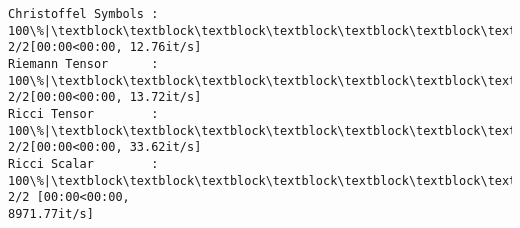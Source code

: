 \documentclass[11pt]{article}
\newcommand{\prompt}[4]{
        {\ttfamily\llap{{\color{#2}[#3]:\hspace{3pt}#4}}\vspace{-\baselineskip}}
    }
\begin{document}
    \begin{Verbatim}[commandchars=\\\{\}]
Christoffel Symbols : 100\%|\textblock\textblock\textblock\textblock\textblock\textblock\textblock\textblock\textblock\textblock\textblock\textblock\textblock\textblock\textblock\textblock\textblock\textblock\textblock\textblock\textblock\textblock\textblock\textblock\textblock\textblock\textblock\textblock\textblock\textblock\textblock\textblock\textblock\textblock\textblock| 2/2[00:00<00:00, 12.76it/s]
Riemann Tensor      : 100\%|\textblock\textblock\textblock\textblock\textblock\textblock\textblock\textblock\textblock\textblock\textblock\textblock\textblock\textblock\textblock\textblock\textblock\textblock\textblock\textblock\textblock\textblock\textblock\textblock\textblock\textblock\textblock\textblock\textblock\textblock\textblock\textblock\textblock\textblock\textblock| 2/2[00:00<00:00, 13.72it/s]
Ricci Tensor        : 100\%|\textblock\textblock\textblock\textblock\textblock\textblock\textblock\textblock\textblock\textblock\textblock\textblock\textblock\textblock\textblock\textblock\textblock\textblock\textblock\textblock\textblock\textblock\textblock\textblock\textblock\textblock\textblock\textblock\textblock\textblock\textblock\textblock\textblock\textblock\textblock| 2/2[00:00<00:00, 33.62it/s]
Ricci Scalar        : 100\%|\textblock\textblock\textblock\textblock\textblock\textblock\textblock\textblock\textblock\textblock\textblock\textblock\textblock\textblock\textblock\textblock\textblock\textblock\textblock\textblock\textblock\textblock\textblock\textblock\textblock\textblock\textblock\textblock\textblock\textblock\textblock\textblock\textblock| 2/2 [00:00<00:00,
8971.77it/s]
    \end{Verbatim}
 
            
\prompt{Out}{outcolor}{10}{}
    
\end{document}
